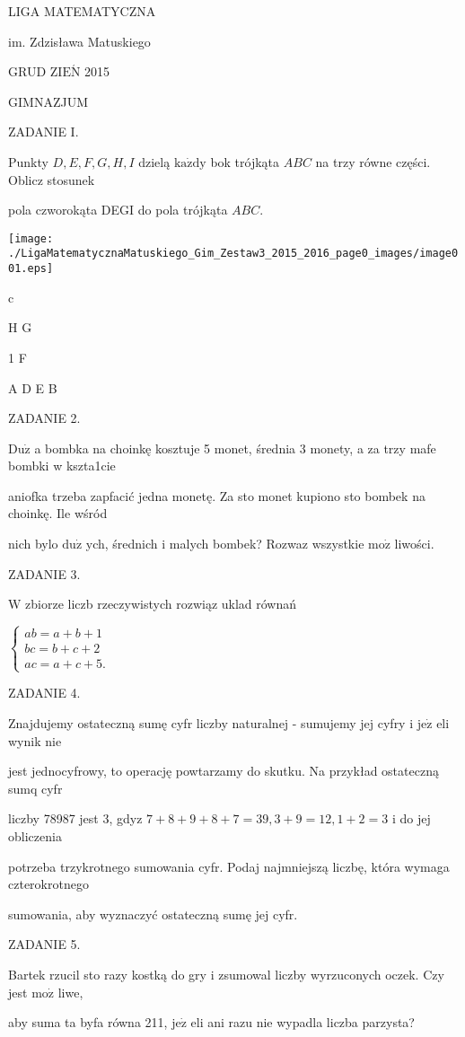 \documentclass[a4paper,12pt]{article}
\begin{document}
LIGA MATEMATYCZNA

im. Zdzisława Matuskiego

GRUD Z$\mathrm{I}\mathrm{E}\acute{\mathrm{N}}$ 2015

GIMNAZJUM

ZADANIE I.

Punkty $D, E, F, G, H, I$ dzielą $\mathrm{k}\mathrm{a}\dot{\mathrm{z}}\mathrm{d}\mathrm{y}$ bok trójkąta $ABC$ na trzy równe części. Oblicz stosunek

pola czworokąta DEGI do pola trójkąta $ABC.$
\begin{center}
\texttt{[image: ./LigaMatematycznaMatuskiego\_Gim\_Zestaw3\_2015\_2016\_page0\_images/image001.eps]}
\end{center}
c

H G

1  F

A  D E  B

ZADANIE 2.

$\mathrm{D}\mathrm{u}\dot{\mathrm{z}}$ a bombka na choinkę kosztuje 5 monet, średnia 3 monety, a za trzy mafe bombki w kszta1cie

aniofka trzeba zapfacić jedna monetę. Za sto monet kupiono sto bombek na choinkę. Ile wśród

nich bylo $\mathrm{d}\mathrm{u}\dot{\mathrm{z}}$ ych, średnich i malych bombek? Rozwaz wszystkie $\mathrm{m}\mathrm{o}\dot{\mathrm{z}}$ liwości.

ZADANIE 3.

$\mathrm{W}$ zbiorze liczb rzeczywistych rozwiąz uklad równań

$\left\{\begin{array}{l}
ab=a+b+1\\
bc=b+c+2\\
ac=a+c+5.
\end{array}\right.$

ZADANIE 4.

Znajdujemy ostateczną sumę cyfr liczby naturalnej - sumujemy jej cyfry i $\mathrm{j}\mathrm{e}\dot{\mathrm{z}}$ eli wynik nie

jest jednocyfrowy, to operację powtarzamy do skutku. Na przykład ostateczną sumq cyfr

liczby 78987 jest 3, gdyz $7+8+9+8+7= 39, 3+9 = 12, 1+2 = 3$ i do jej obliczenia

potrzeba trzykrotnego sumowania cyfr. Podaj najmniejszą liczbę, która wymaga czterokrotnego

sumowania, aby wyznaczyć ostateczną sumę jej cyfr.

ZADANIE 5.

Bartek rzucil sto razy kostką do gry i zsumowal liczby wyrzuconych oczek. Czy jest $\mathrm{m}\mathrm{o}\dot{\mathrm{z}}$ liwe,

aby suma ta byfa równa 211, $\mathrm{j}\mathrm{e}\dot{\mathrm{z}}$ eli ani razu nie wypadla liczba parzysta?
\end{document}
